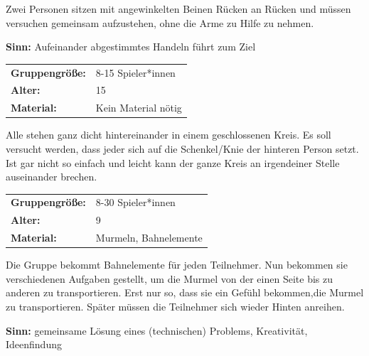 Zwei Personen sitzen mit angewinkelten Beinen Rücken an Rücken und müssen versuchen gemeinsam aufzustehen, ohne die Arme zu Hilfe zu nehmen.

\textbf{Sinn:} Aufeinander abgestimmtes Handeln führt zum Ziel


\begin{table}[H]
\begin{tabular}{>{\bfseries}lp{8cm}}
   Gruppengröße:   & 8-15 Spieler*innen\\
    Alter: & 15 \\
    Material: & Kein Material nötig \\ 
\end{tabular}
\end{table} 

Alle stehen ganz dicht hintereinander in einem geschlossenen Kreis. Es soll versucht werden, dass jeder sich auf die Schenkel/Knie der hinteren Person setzt. Ist gar nicht so einfach und leicht kann der ganze Kreis an irgendeiner Stelle auseinander brechen.

\begin{table}[H]
\begin{tabular}{>{\bfseries}lp{8cm}}
   Gruppengröße:   & 8-30 Spieler*innen\\
    Alter: & 9 \\
    Material: & Murmeln, Bahnelemente \\ 
\end{tabular}
\end{table} 
Die Gruppe bekommt Bahnelemente für jeden Teilnehmer. Nun bekommen sie verschiedenen Aufgaben gestellt, um die Murmel von der einen Seite bis zu anderen zu transportieren.  Erst nur so, dass sie ein Gefühl bekommen,die Murmel zu transportieren. Später müssen die Teilnehmer sich wieder Hinten anreihen.

\textbf{Sinn:} gemeinsame Lösung eines (technischen) Problems, Kreativität, Ideenfindung


